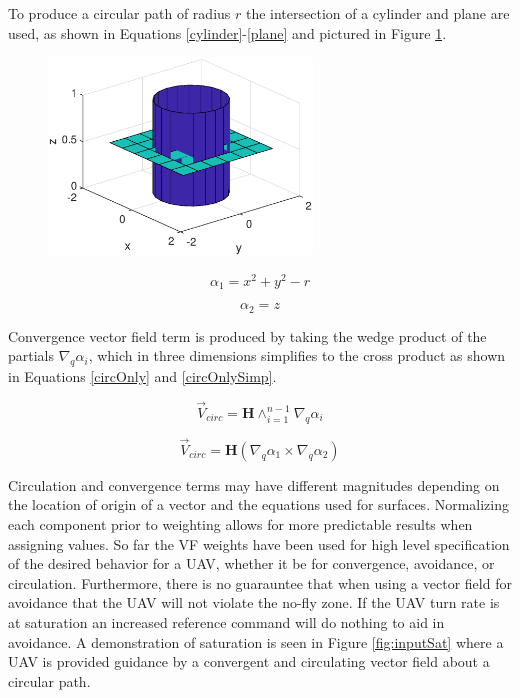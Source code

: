 \documentclass[numbered,pdftex]{ohio-etd}
\begin{document}
To produce a circular path of radius $r$ the intersection of a cylinder and plane are used, as shown in Equations \ref{cylinder}-\ref{plane} and pictured in Figure \ref{fig:cylinderPlane}.

\begin{figure}
	\centering
	\includegraphics[width=7cm]{PaperFigures/cylinderPlane}
	\caption{}
	\label{fig:cylinderPlane}
\end{figure}

\begin{equation}
\label{cylinder}
\alpha_1 = x^2+y^2-r
\end{equation}

\begin{equation}
\label{plane}
\alpha_2 = z
\end{equation}

Convergence vector field term is produced by taking the wedge product of the partials $\nabla_q\alpha_i$, which in three dimensions simplifies to the cross product as shown in Equations \ref{circOnly} and \ref{circOnlySimp}.


\begin{equation}
\vec{V}_{circ} =  \boldsymbol{H}\wedge_{i=1}^{n-1}\nabla_q\alpha_i 
\label{circOnly}
\end{equation}

\begin{equation}
\vec{V}_{circ} =  \boldsymbol{H}(\nabla_q\alpha_1 \times \nabla_q\alpha_2) 
\label{circOnlySimp}
\end{equation}


Circulation and convergence terms may have different magnitudes depending on the location of origin of a vector and the equations used for surfaces. Normalizing each component prior to weighting allows for more predictable results when assigning values. So far the VF weights have been used for high level specification of the desired behavior for a UAV, whether it be for convergence, avoidance, or circulation. Furthermore, there is no guarauntee that when using a vector field for avoidance that the UAV will not violate the no-fly zone. If the UAV turn rate is at saturation an increased reference command will do nothing to aid in avoidance. A demonstration of saturation is seen in Figure \ref{fig:inputSat} where a UAV is provided guidance by a convergent and circulating vector field about a circular path. 
\end{document}
